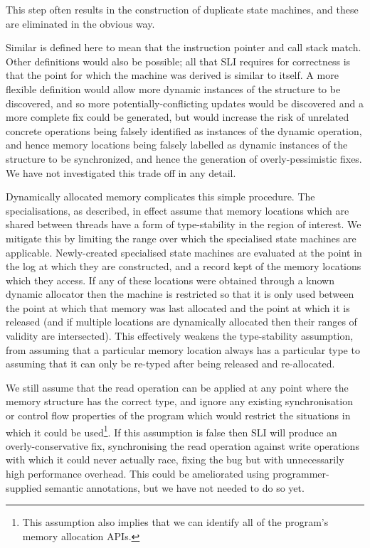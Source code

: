 \documentclass[10pt,twocolumn,preprint,natbib,authoryear]{sigplanconf}
\newcommand{\editorial}[1]{}
\begin{document}
This step often results in the construction of duplicate state
machines, and these are eliminated in the obvious
way\editorial{Someone complained that the previous draft didn't
  specify the definition of duplicate, but I really can't be bothered
  to spell it out.}.

Similar is defined here to mean that the instruction pointer and call
stack match.  Other definitions would also be possible; all that SLI
requires for correctness is that the point for which the machine was
derived is similar to itself.  A more flexible definition would allow
more dynamic instances of the structure to be discovered, and so more
potentially-conflicting updates would be discovered and a more
complete fix could be generated, but would increase the risk of
unrelated concrete operations being falsely identified as instances of
the dynamic operation, and hence memory locations being falsely
labelled as dynamic instances of the structure to be synchronized, and
hence the generation of overly-pessimistic fixes\editorial{Holly run
  on sentence, Batman.}.  We have not investigated this trade off in
any detail.

Dynamically allocated memory complicates this simple procedure.  The
specialisations, as described, in effect assume that memory locations
which are shared between threads have a form of type-stability in the
region of interest.  We mitigate this by limiting the range over which
the specialised state machines are applicable.  Newly-created
specialised state machines are evaluated at the point in the log at
which they are constructed, and a record kept of the memory locations
which they access.  If any of these locations were obtained through a
known dynamic allocator then the machine is restricted so that it is
only used between the point at which that memory was last allocated
and the point at which it is released (and if multiple locations are
dynamically allocated then their ranges of validity are intersected).
This effectively weakens the type-stability assumption, from assuming
that a particular memory location always has a particular type to
assuming that it can only be re-typed after being released and
re-allocated.\editorial{This isn't right: after specialisation, we
  could still refer to pointers in the heap, and we won't track
  validity of the referenced objects.  Probably doesn't matter in
  practice.}

We still assume that the read operation can be applied at any point
where the memory structure has the correct type, and ignore any
existing synchronisation or control flow properties of the program
which would restrict the situations in which it could be
used\footnote{This assumption also implies that we can identify all of
  the program's memory allocation APIs.}.  If this assumption is false
then SLI will produce an overly-conservative fix, synchronising the
read operation against write operations with which it could never
actually race, fixing the bug but with unnecessarily high performance
overhead.  This could be ameliorated using programmer-supplied
semantic annotations, but we have not needed to do so yet.
\end{document}
